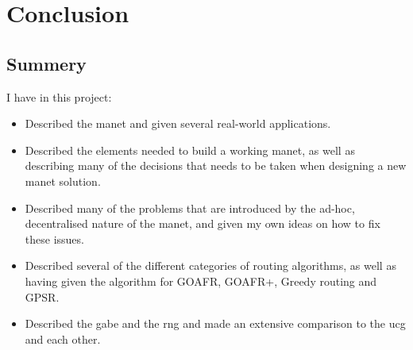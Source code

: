
\section{Conclusion}
\label{section:conclusion}

\subsection{Summery}

I have in this project:
\begin{itemize}
\item Described the \ac{manet} and given several real-world applications.
\item Described the elements needed to build a working \ac{manet}, as well as describing many of the decisions that needs to be taken when designing a new \ac{manet} solution.
\item Described many of the problems that are introduced by the ad-hoc, decentralised nature of the \ac{manet}, and given my own ideas on how to fix these issues.
\item Described several of the different categories of routing algorithms, as well as having given the algorithm for GOAFR, GOAFR+, Greedy routing and GPSR.
\item Described the \ac{gabe} and the \ac{rng} and made an extensive comparison to the \ac{ucg} and each other.
\end{itemize}

